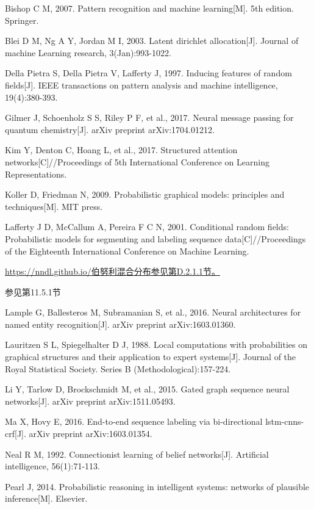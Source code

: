 \documentclass[10pt]{article}
\begin{document}
Bishop C M, 2007. Pattern recognition and machine learning[M]. 5th edition. Springer.

Blei D M, Ng A Y, Jordan M I, 2003. Latent dirichlet allocation[J]. Journal of machine Learning research, 3(Jan):993-1022.

Della Pietra S, Della Pietra V, Lafferty J, 1997. Inducing features of random fields[J]. IEEE transactions on pattern analysis and machine intelligence, 19(4):380-393.

Gilmer J, Schoenholz S S, Riley P F, et al., 2017. Neural message passing for quantum chemistry[J]. arXiv preprint arXiv:1704.01212.

Kim Y, Denton C, Hoang L, et al., 2017. Structured attention networks[C]//Proceedings of 5th International Conference on Learning Representations.

Koller D, Friedman N, 2009. Probabilistic graphical models: principles and techniques[M]. MIT press.

Lafferty J D, McCallum A, Pereira F C N, 2001. Conditional random fields: Probabilistic models for segmenting and labeling sequence data[C]//Proceedings of the Eighteenth International Conference on Machine Learning.

\href{https://nndl.github.io/%E4%BC%AF%E5%8A%AA%E5%88%A9%E6%B7%B7%E5%90%88%E5%88%86%E5%B8%83%E5%8F%82%E8%A7%81%E7%AC%ACD.2.1.1%E8%8A%82%E3%80%82}{https://nndl.github.io/伯努利混合分布参见第D.2.1.1节。}

参见第11.5.1节

Lample G, Ballesteros M, Subramanian S, et al., 2016. Neural architectures for named entity recognition[J]. arXiv preprint arXiv:1603.01360.

Lauritzen S L, Spiegelhalter D J, 1988. Local computations with probabilities on graphical structures and their application to expert systems[J]. Journal of the Royal Statistical Society. Series B (Methodological):157-224.

Li Y, Tarlow D, Brockschmidt M, et al., 2015. Gated graph sequence neural networks[J]. arXiv preprint arXiv:1511.05493.

Ma X, Hovy E, 2016. End-to-end sequence labeling via bi-directional lstm-cnns-crf[J]. arXiv preprint arXiv:1603.01354.

Neal R M, 1992. Connectionist learning of belief networks[J]. Artificial intelligence, 56(1):71-113.

Pearl J, 2014. Probabilistic reasoning in intelligent systems: networks of plausible inference[M]. Elsevier.
\end{document}
